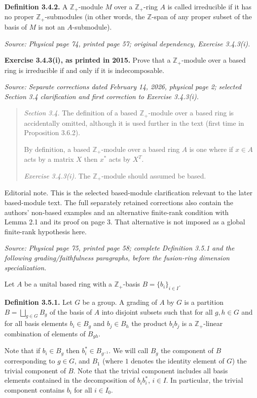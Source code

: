 \documentclass[11pt]{article}
\newcommand{\Z}{\mathbb{Z}}
\newcommand{\Zp}{\mathbb{Z}_+}
\newcommand{\sourceloc}[1]{\par\smallskip\noindent\textit{Source: #1.}\par\nopagebreak[4]\smallskip}
\newcommand{\editorial}[1]{\par\smallskip\noindent\textsf{Editorial note.} #1\par\smallskip}
\begin{document}
\noindent\textbf{Definition 3.4.2.}
A $\Zp$-module $M$ over a $\Zp$-ring $A$ is called irreducible if it has
no proper $\Zp$-submodules (in other words, the $\Z$-span of any proper
subset of the basis of $M$ is not an $A$-submodule).

\sourceloc{Physical page 74, printed page 57; original dependency, Exercise 3.4.3(i)}
\noindent\textbf{Exercise 3.4.3(i), as printed in 2015.}
Prove that a $\Zp$-module over a based ring is irreducible if and only
if it is indecomposable.

\sourceloc{Separate corrections dated February 14, 2026, physical page 2; selected Section 3.4 clarification and first correction to Exercise 3.4.3(i)}
\begin{quote}
\textit{Section 3.4.} The definition of a based $\Zp$-module over a based
ring is accidentally omitted, although it is used further in the text
(first time in Proposition 3.6.2).

By definition, a based $\Zp$-module over a based ring $A$ is one where
if $x\in A$ acts by a matrix $X$ then $x^*$ acts by $X^T$.

\textit{Exercise 3.4.3(i).} The $\Zp$-module should assumed be based.
\end{quote}
\editorial{This is the selected based-module clarification relevant to
the later based-module text. The full separately retained corrections
also contain the authors' non-based examples and an alternative
finite-rank condition with Lemma 2.1 and its proof on page 3. That
alternative is not imposed as a global finite-rank hypothesis here.}

\sourceloc{Physical page 75, printed page 58; complete Definition 3.5.1 and the following grading/faithfulness paragraphs, before the fusion-ring dimension specialization}
Let $A$ be a unital based ring with a $\Zp$-basis $B=\{b_i\}_{i\in I}$.

\noindent\textbf{Definition 3.5.1.}
Let $G$ be a group. A grading of $A$ by $G$ is a partition
$B=\bigsqcup_{g\in G}B_g$ of the basis of $A$ into disjoint subsets such
that for all $g,h\in G$ and for all basis elements $b_i\in B_g$ and
$b_j\in B_h$ the product $b_i b_j$ is a $\Zp$-linear combination of
elements of $B_{gh}$.

Note that if $b_i\in B_g$ then $b_i^*\in B_{g^{-1}}$. We will call $B_g$
the component of $B$ corresponding to $g\in G$, and $B_1$ (where $1$
denotes the identity element of $G$) the trivial component of $B$.
Note that the trivial component includes all basis elements contained
in the decomposition of $b_i b_i^*$, $i\in I$. In particular, the trivial
component contains $b_i$ for all $i\in I_0$.
\end{document}
